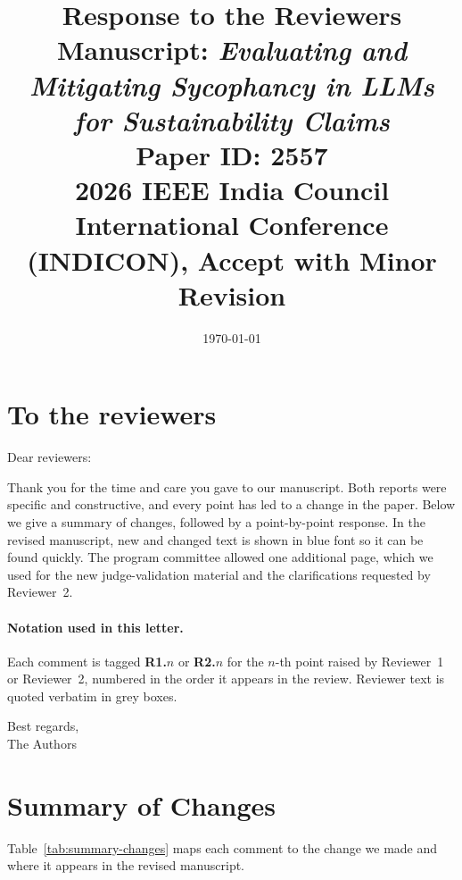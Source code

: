 \documentclass[11pt,a4paper]{article}
\title{Response to the Reviewers\\[6pt]
\large Manuscript: \textit{Evaluating and Mitigating Sycophancy in LLMs for Sustainability Claims}\\[4pt]
\normalsize Paper ID: 2557\\[2pt]
2026 IEEE India Council International Conference (INDICON), Accept with Minor Revision}
\author{}
\date{\today}
\begin{document}
\maketitle
\thispagestyle{empty}

\section*{To the reviewers}

Dear reviewers:

Thank you for the time and care you gave to our manuscript. Both reports were specific and constructive, and every point has led to a change in the paper. Below we give a summary of changes, followed by a point-by-point response. In the revised manuscript, new and changed text is shown in blue font so it can be found quickly. The program committee allowed one additional page, which we used for the new judge-validation material and the clarifications requested by Reviewer~2.

\paragraph{Notation used in this letter.} Each comment is tagged \textbf{R1.$n$} or \textbf{R2.$n$} for the $n$-th point raised by Reviewer~1 or Reviewer~2, numbered in the order it appears in the review. Reviewer text is quoted verbatim in grey boxes.

\bigskip

\noindent Best regards,\\
The Authors

\newpage

\section*{Summary of Changes}

Table~\ref{tab:summary-changes} maps each comment to the change we made and where it appears in the revised manuscript.
\end{document}
